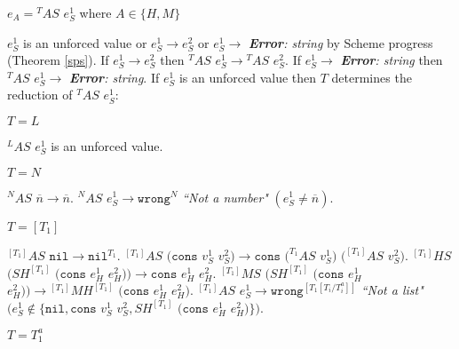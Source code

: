 \begin{case}

$e_{A}={^{T}A}S$ $e_{S}^{1}$ where $A\in\lbrace H,M\rbrace$

$e_{S}^{1}$ is an unforced value or $e_{S}^{1}\rightarrow e_{S}^{2}$ or $e_{S}^{1}\rightarrow$ \emph{\textbf{Error}: string} by Scheme progress (Theorem \ref{sps}).  If $e_{S}^{1}\rightarrow e_{S}^{2}$ then $^{T}AS$ $e_{S}^{1}\rightarrow{^{T}A}S$ $e_{S}^{2}$.  If $e_{S}^{1}\rightarrow$ \emph{\textbf{Error}: string} then $^{T}AS$ $e_{S}^{1}\rightarrow$ \emph{\textbf{Error}: string}.  If $e_{S}^{1}$ is an unforced value then $T$ determines the reduction of $^{T}AS$ $e_{S}^{1}$:

\begin{subcase}

$T=L$

$^{L}AS$ $e_{S}^{1}$ is an unforced value.

\end{subcase}

\begin{subcase}

$T=N$

$^{N}AS$ $\overline{n}\rightarrow\overline{n}$.  $^{N}AS$ $e_{S}^{1}\rightarrow\mathtt{wrong}^{N}$ \emph{``Not a number"} $(e_{S}^{1}\neq\overline{n})$.

\end{subcase}

\begin{subcase}

$T=[T_{1}]$

$^{[T_{1}]}AS$ $\mathtt{nil}\rightarrow\mathtt{nil}^{T_{1}}$.  $^{[T_{1}]}AS$ $(\mathtt{cons}$ $v_{S}^{1}$ $v_{S}^{2})\rightarrow\mathtt{cons}$ $(^{T_{1}}AS$ $v_{S}^{1})$ $(^{[T_{1}]}AS$ $v_{S}^{2})$.  $^{[T_{1}]}HS$ $(SH^{[T_{1}]}$ $(\mathtt{cons}$ $e_{H}^{1}$ $e_{H}^{2}))\rightarrow\mathtt{cons}$ $e_{H}^{1}$ $e_{H}^{2}$.  $^{[T_{1}]}MS$ $(SH^{[T_{1}]}$ $(\mathtt{cons}$ $e_{H}^{1}$ $e_{H}^{2}))\rightarrow{^{[T_{1}]}M}H^{[T_{1}]}$ $(\mathtt{cons}$ $e_{H}^{1}$ $e_{H}^{2})$.  $^{[T_{1}]}AS$ $e_{S}^{1}\rightarrow\mathtt{wrong}^{[T_{1}[T_{i}/T_{i}^{a}]]}$ \emph{``Not a list"} $(e_{S}^{1}\not\in\lbrace\mathtt{nil},\mathtt{cons}$ $v_{S}^{1}$ $v_{S}^{2},SH^{[T_{1}]}$ $(\mathtt{cons}$ $e_{H}^{1}$ $e_{H}^{2})\rbrace)$.

\end{subcase}

\begin{subcase}

$T=T_{1}^{a}$


\end{subcase}
\end{case}
